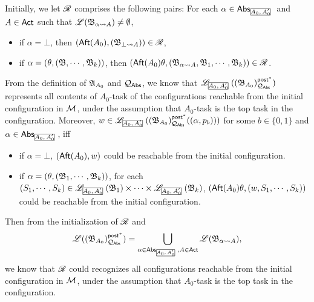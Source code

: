 {%
Initially, we let $\mathscr{R}$ comprises the following pairs:
For each $\alpha\in\abs_{\mhcancel{A_0,A_0'}}$ and $A\in{\sf Act}$ such that ${\mathscr{L} }({\mathfrak{B} }_{\alpha\rightsquigarrow A})\neq \emptyset$,
\begin{itemize}
    \item if $\alpha = \bot$, then $({\sf Aft}(A_0), ({\mathfrak{B} }_{\bot\rightsquigarrow A}))\in\mathscr{R}$,
    \item if $\alpha = (\theta,({\mathfrak{B} },\cdots,{\mathfrak{B} }_k))$, then $({\sf Aft}(A_0)\theta, ({\mathfrak{B} }_{\alpha\rightsquigarrow A}, {\mathfrak{B} }_1, \cdots, {\mathfrak{B} }_k))\in\mathscr{R}$.
\end{itemize}
From the definition of ${\mathfrak{A} }_{A_0}$ and ${\mathcal{Q} }_{{\mathsf{Abs} }}$, we know that $\Lang_{\mhcancel{A_0,A_0'}}((\AutB_{A_0})^{\post^*}_{\Qq_{\abs}})$ represents all contents of $A_0$-task of the configurations reachable from the initial configuration in ${\mathcal{M} }$, under the assumption that $A_0$-task is the top task in the configuration. Moreover, $w\in\Lang_{\mhcancel{A_0,A_0'}}((\AutB_{A_0})^{\post^*}_{\Qq_{\abs}}((\alpha,p_b)))$ for some $b\in\{0,1\}$ and $\alpha \in \abs_{\mhcancel{A_0,A_0'}}$, iff
\begin{itemize}
    \item if $\alpha = \bot$, $({\sf Aft}(A_0), w)$ could be reachable from the initial configuration.
    \item if $\alpha = (\theta, ({\mathfrak{B} }_1, \cdots, {\mathfrak{B} }_k))$, for each $(S_1, \cdots, S_k) \in \Lang_{\mhcancel{A_0,A_0'}}(\AutB_1) \times \cdots \times \Lang_{\mhcancel{A_0,A_0'}}(\AutB_k)$, $({\sf Aft}(A_0)\theta, (w, S_1, \cdots, S_k))$ could be reachable from the initial configuration.
\end{itemize}
Then from the initialization of $\mathscr{R}$ and
$$\Lang((\AutB_{A_0})^{\post^*}_{\Qq_{\abs}}) = \bigcup\limits_{\alpha\in\abs_{\mhcancel{A_0,A_0'}}, A\in\act}\Lang(\AutB_{\alpha\rightsquigarrow A}),$$
we know that $\mathscr{R}$ could recognizes all configurations reachable from the initial configuration in ${\mathcal{M} }$, under the assumption that $A_0$-task is the top task in the configuration.

}
